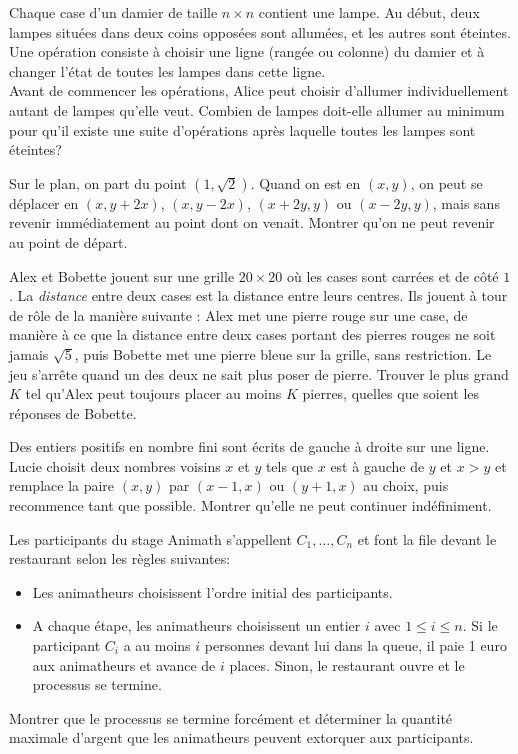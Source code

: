 \begin{exo}
Chaque case d'un damier de taille $n\times n$ contient une lampe. Au début, deux lampes situées dans deux coins opposées sont allumées, et les autres sont éteintes. Une opération consiste à choisir une ligne (rangée ou colonne) du damier et à changer l'état de toutes les lampes dans cette ligne.\\
Avant de commencer les opérations, Alice peut choisir d'allumer individuellement autant de lampes qu'elle veut. Combien de lampes doit-elle allumer au minimum pour qu'il existe une suite d'opérations après laquelle toutes les lampes sont éteintes?
\end{exo}

\begin{exo}
Sur le plan, on part du point $(1,\sqrt2)$. Quand on est en $(x,y)$, on peut se déplacer en $(x,y+2x)$, $(x,y-2x)$, $(x+2y,y)$ ou $(x-2y,y)$, mais sans revenir immédiatement au point dont on venait. Montrer qu'on ne peut revenir au point de départ.
\end{exo}

\begin{exo}
Alex et Bobette jouent sur une grille $20\times20$ où les cases sont carrées et de côté $1$. La \emph{distance} entre deux cases est la distance entre leurs centres. Ils jouent à tour de rôle de la manière suivante : Alex met une pierre rouge sur une case, de manière à ce que la distance entre deux cases portant des pierres rouges ne soit jamais $\sqrt5$, puis Bobette met une pierre bleue sur la grille, sans restriction. Le jeu s'arrête quand un des deux ne sait plus poser de pierre. Trouver le plus grand $K$ tel qu'Alex peut toujours placer au moins $K$ pierres, quelles que soient les réponses de Bobette.
\end{exo}

\begin{exo}
Des entiers positifs en nombre fini sont écrits de gauche à droite sur une ligne. Lucie choisit deux nombres voisins $x$ et $y$ tels que $x$ est à gauche de $y$ et $x>y$ et remplace la paire $(x,y)$ par $(x-1,x)$ ou $(y+1,x)$ au choix, puis recommence tant que possible. Montrer qu'elle ne peut continuer indéfiniment.
\end{exo}

\begin{exo}
Les participants du stage Animath s'appellent $C_1,\ldots,C_n$ et font la file devant le restaurant selon les règles suivantes:
\begin{itemize}
\item
Les animatheurs choisissent l'ordre initial des participants.
\item
A chaque étape, les animatheurs choisissent un entier $i$ avec $1\leq i\leq n$. Si le participant $C_i$ a au moins $i$ personnes devant lui dans la queue, il paie 1 euro aux animatheurs et avance de $i$ places. Sinon, le restaurant ouvre et le processus se termine.
\end{itemize}
Montrer que le processus se termine forcément et déterminer la quantité maximale d'argent que les animatheurs peuvent extorquer aux participants.
\end{exo}

